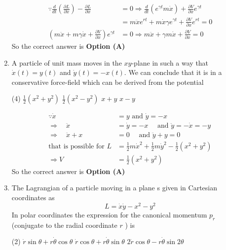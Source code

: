 \begin{enumerate}
\begin{answer}
\begin{align*}
	\because \frac{d}{d t}\left(\frac{\partial L}{\partial \dot{x}}\right)-\frac{\partial L}{\partial x}&=0 \Rightarrow \frac{d}{d t}\left(e^{\gamma t} m \dot{x}\right)+\frac{\partial V}{\partial x} e^{\gamma t}\\&=m \ddot{x} e^{r t}+m \dot{x} \gamma e^{\gamma t}+\frac{\partial V}{\partial x} e^{r t}=0\\
	\left(m \ddot{x}+m \gamma \dot{x}+\frac{\partial V}{\partial x}\right) e^{\gamma t}&=0 \Rightarrow m \ddot{x}+\gamma m \dot{x}+\frac{\partial V}{\partial x}=0
	\end{align*}
	So the correct answer is \textbf{Option (A)}
\end{answer}
	\item A particle of unit mass moves in the $x y$-plane in such a way that $\dot{x}(t)=y(t)$ and $\dot{y}(t)=-x(t) .$ We can conclude that it is in a conservative force-field which can be derived from the potential
	{}
	\begin{tasks}(4)
		\task[\textbf{A.}] $\frac{1}{2}\left(x^{2}+y^{2}\right)$
		\task[\textbf{B.}] $\frac{1}{2}\left(x^{2}-y^{2}\right)$
		\task[\textbf{C.}] $x+y$
		\task[\textbf{D.}] $x-y$
	\end{tasks}	
\begin{answer}
	\begin{align*}
	\because \dot{x}&=y\text{ and }\dot{y}=-x\\
	\Rightarrow \quad \ddot{x}&=\dot{y}=-x \quad\text{ and }\ddot{y}=-\dot{x}=-y\\
	\Rightarrow \quad \ddot{x}+x&=0 \quad\text{ and }\ddot{y}+y=0\\
	\text{that is possible for }L&=\frac{1}{2} m \dot{x}^{2}+\frac{1}{2} m \dot{y}^{2}-\frac{1}{2}\left(x^{2}+y^{2}\right) \\\Rightarrow V&=\frac{1}{2}\left(x^{2}+y^{2}\right)
	\end{align*}
	So the correct answer is \textbf{Option (A)}
\end{answer}
	\item The Lagrangian of a particle moving in a plane s given in Cartesian coordinates as
	$$
	L=\dot{x} \dot{y}-x^{2}-y^{2}
	$$
	In polar coordinates the expression for the canonical momentum $p_{r}$ (conjugate to the radial coordinate $r$ ) is
	{}
	\begin{tasks}(2)
		\task[\textbf{A.}] $\dot{r} \sin \theta+r \dot{\theta} \cos \theta$
		\task[\textbf{B.}]  $\dot{r} \cos \theta+r \dot{\theta} \sin \theta$
		\task[\textbf{C.}] $2 \dot{r} \cos \theta-r \dot{\theta} \sin 2 \theta$

\end{tasks}
\end{enumerate}
